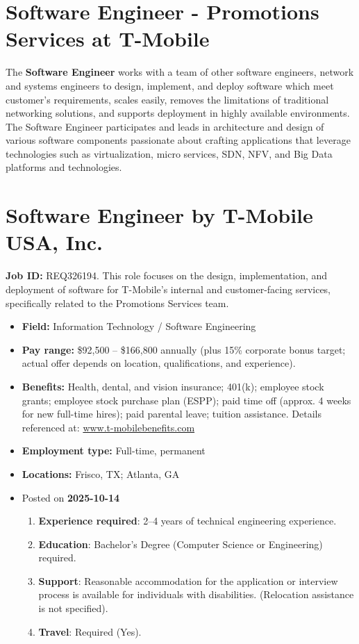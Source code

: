 \documentclass[11pt]{article}
\begin{document}
\section*{Software Engineer - Promotions Services at T-Mobile}

The \textbf{Software Engineer} works with a team of other software engineers, 
network and systems engineers to design, implement, and deploy software which 
meet customer's requirements, scales easily, removes the limitations of 
traditional networking solutions, and supports deployment in highly available 
environments. The Software Engineer participates and leads in architecture 
and design of various software components passionate about crafting 
applications that leverage technologies such as virtualization, micro 
services, SDN, NFV, and Big Data platforms and technologies.

\section*{Software Engineer by \textbf{T-Mobile USA, Inc.}}
\textbf{Job ID:} REQ326194. This role focuses on the design, implementation, 
and deployment of software for T-Mobile's internal and customer-facing 
services, specifically related to the Promotions Services team.

\begin{itemize}
  \item \textbf{Field:} Information Technology / Software Engineering
  \item \textbf{Pay range:} \$92,500 -- \$166,800 annually (plus 15\% corporate bonus target; 
    actual offer depends on location, qualifications, and experience).
  \item \textbf{Benefits:} Health, dental, and vision insurance; 401(k); 
    employee stock grants; employee stock purchase plan (ESPP); paid time off 
    (approx. 4 weeks for new full-time hires); paid parental leave; 
    tuition assistance. Details referenced at: 
    \url{www.t-mobilebenefits.com}
  \item \textbf{Employment type:} Full-time, permanent
  \item \textbf{Locations:} Frisco, TX; Atlanta, GA
  \item Posted on \textbf{2025-10-14}
  \begin{enumerate}[label=\arabic*., leftmargin=*]
    \item \textbf{Experience required}: 2--4 years of technical engineering 
      experience.
    \item \textbf{Education}: Bachelor's Degree (Computer Science or 
      Engineering) required.
    \item \textbf{Support}: Reasonable accommodation for the application or 
      interview process is available for individuals with disabilities. 
      (Relocation assistance is not specified).
    \item \textbf{Travel}: Required (Yes).
  \end{enumerate}
\end{itemize}
\end{document}
